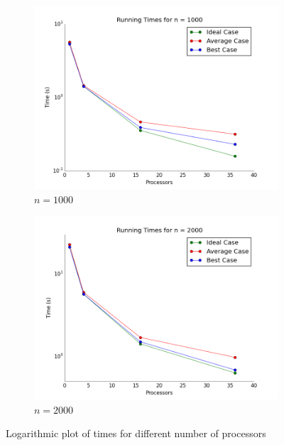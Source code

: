 \documentclass[a4paper]{article}
\begin{document}
    \begin{figure}[htp!]
      \centering
      \begin{subfigure}{.5\textwidth}
        \centering
        \includegraphics[width=.99\textwidth]{../2 Analysis/1000.png}
        \caption{$n = 1000$}
        \label{fig:1000}
      \end{subfigure}%
      \begin{subfigure}{.5\textwidth}
        \centering
        \includegraphics[width=.99\textwidth]{../2 Analysis/2000.png}
        \caption{$n = 2000$}
        \label{fig:2000}
      \end{subfigure}
      \caption{Logarithmic plot of times for different number of processors}
    \end{figure}
\end{document}
